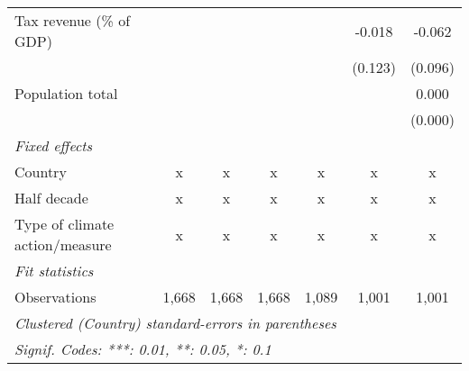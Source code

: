 \begin{tabular}{lcccccc}
   Tax revenue (\% of GDP)                &         &         &               &               & -0.018        & -0.062\\   
                                          &         &         &               &               & (0.123)       & (0.096)\\   
   Population total                       &         &         &               &               &               & 0.000\\   
                                          &         &         &               &               &               & (0.000)\\   
   \emph{Fixed effects}\\
   Country                                & x       & x       & x             & x             & x             & x\\  
   Half decade                            & x       & x       & x             & x             & x             & x\\  
   Type of climate action/measure         & x       & x       & x             & x             & x             & x\\  
   \midrule \emph{Fit statistics}\\
   Observations                           & 1,668   & 1,668   & 1,668         & 1,089         & 1,001         & 1,001\\  
   \midrule
   \multicolumn{7}{l}{\emph{Clustered (Country) standard-errors in parentheses}}\\
   \multicolumn{7}{l}{\emph{Signif. Codes: ***: 0.01, **: 0.05, *: 0.1}}\\
\end{tabular}
\par\endgroup


